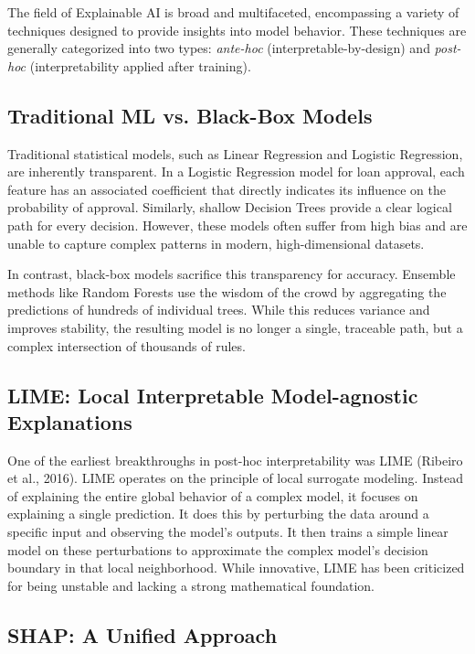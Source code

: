 \documentclass[12pt, a4paper]{article}
\begin{document}
The field of Explainable AI is broad and multifaceted, encompassing a variety of techniques designed to provide insights into model behavior. These techniques are generally categorized into two types: \textit{ante-hoc} (interpretable-by-design) and \textit{post-hoc} (interpretability applied after training).

\subsection{Traditional ML vs. Black-Box Models}

Traditional statistical models, such as Linear Regression and Logistic Regression, are inherently transparent. In a Logistic Regression model for loan approval, each feature has an associated coefficient that directly indicates its influence on the probability of approval. Similarly, shallow Decision Trees provide a clear logical path for every decision. However, these models often suffer from high bias and are unable to capture complex patterns in modern, high-dimensional datasets.

In contrast, black-box models sacrifice this transparency for accuracy. Ensemble methods like Random Forests use the wisdom of the crowd by aggregating the predictions of hundreds of individual trees. While this reduces variance and improves stability, the resulting model is no longer a single, traceable path, but a complex intersection of thousands of rules.

\subsection{LIME: Local Interpretable Model-agnostic Explanations}

One of the earliest breakthroughs in post-hoc interpretability was LIME (Ribeiro et al., 2016). LIME operates on the principle of local surrogate modeling. Instead of explaining the entire global behavior of a complex model, it focuses on explaining a single prediction. It does this by perturbing the data around a specific input and observing the model's outputs. It then trains a simple linear model on these perturbations to approximate the complex model's decision boundary in that local neighborhood. While innovative, LIME has been criticized for being unstable and lacking a strong mathematical foundation.

\subsection{SHAP: A Unified Approach}
\end{document}
